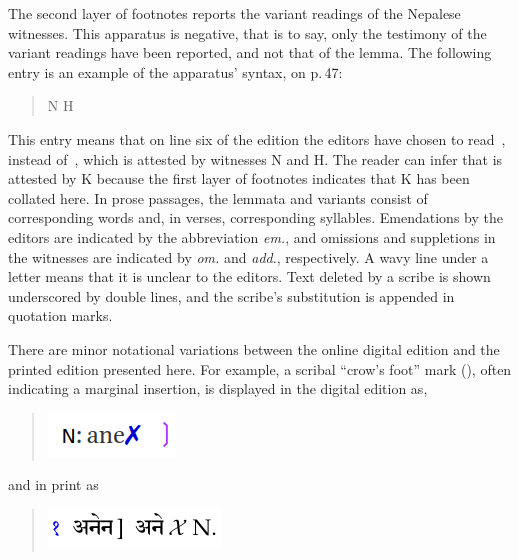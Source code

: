 The second layer of footnotes reports the variant readings of the Nepalese
witnesses. This apparatus is negative, that is to say, only the testimony of
the variant readings have been reported, and not that of the lemma. The
following entry is an example of the apparatus' syntax, on p.\,47:
\begin{quote}
    \dev{6 pratanuṃ ]  pratanū} N H 
\end{quote}
This entry means that on line six of the edition the editors have chosen to
read \,, instead of \,, which is attested by
witnesses N and H. The reader can infer that  is attested by K
because the first layer of footnotes indicates that K has been collated here.
In prose passages, the lemmata and variants consist of corresponding words
and, in verses, corresponding syllables. Emendations by the editors are
indicated by the abbreviation \emph{em.}, and omissions and suppletions in the
witnesses are indicated by \emph{om.} and \emph{add}., respectively. A wavy
line under a letter means that it is unclear to the editors. Text deleted by a
scribe is shown underscored by double lines, and the scribe's substitution is
appended in quotation marks.

There are minor notational variations between the online digital edition and the
printed edition presented here.  For example, a scribal “crow's foot” mark
(), often indicating a marginal insertion, is displayed in the digital 
edition as,
\begin{quote}
    \includegraphics[draft=false,width=.19\linewidth]{media/ane-online}
    \end{quote}
and in print as
\begin{quote}
    \includegraphics[draft=false,width=.24\linewidth]{media/ane-printed}
    \end{quote}




